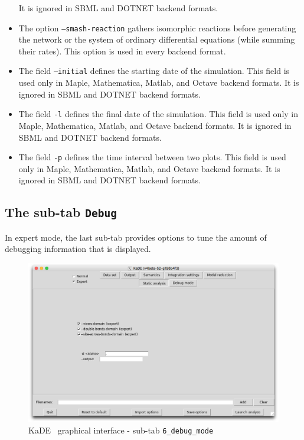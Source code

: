 \documentclass[11pt]{book}
\def\KaDE{\textsf{KaDE}}
\begin{document}
\begin{itemize}
  It is ignored in SBML and DOTNET backend formats.
  \item The option \texttt{--smash-reaction} gathers isomorphic reactions before generating the network or the system of ordinary differential equations (while summing their rates). This option is used in every backend format.
  \item The field \texttt{--initial} defines the starting date of the simulation. This field is used only in Maple, Mathematica, Matlab, and Octave backend formats.
  It is ignored in SBML and DOTNET backend formats.
  \item The field \texttt{-l} defines the final date of the simulation. This field is used only in Maple, Mathematica, Matlab, and Octave backend formats.
  It is ignored in SBML and DOTNET backend formats.
  \item The field \texttt{-p} defines the time interval between two plots. This field is used only in Maple, Mathematica, Matlab, and Octave backend formats.
  It is ignored in SBML and DOTNET backend formats.
\end{itemize}

\subsection{The sub-tab \texttt{Debug}}
\label{kade:debug}
In expert mode, the last sub-tab provides options to tune the amount of debugging information that is displayed.

\begin{figure}[htbp]
\centering
\includegraphics[width=12cm,bb=0 0 1904 1208]{img/kade_5.png}
\caption{\KaDE~ graphical interface - sub-tab \texttt{6\_debug\_mode}}
\label{fig:kade:6}
\end{figure}
\end{document}
